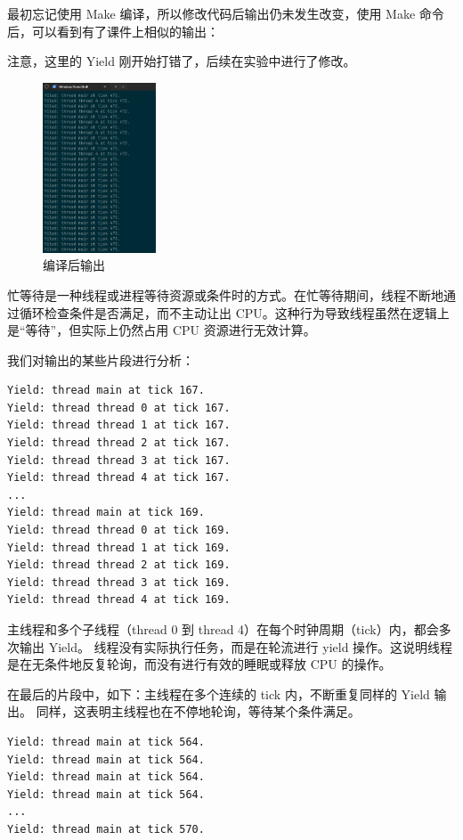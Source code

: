 最初忘记使用 Make 编译，所以修改代码后输出仍未发生改变，使用 Make 命令后，可以看到有了课件上相似的输出：

注意，这里的 Yield 刚开始打错了，后续在实验中进行了修改。
\begin{figure} [H]
    \centering
    \includegraphics[width=0.3\textwidth]{img4/make.png}
    \caption{编译后输出}
    \label{fig:pintos}
\end{figure}

忙等待是一种线程或进程等待资源或条件时的方式。在忙等待期间，线程不断地通过循环检查条件是否满足，而不主动让出 CPU。这种行为导致线程虽然在逻辑上是“等待”，但实际上仍然占用 CPU 资源进行无效计算。

我们对输出的某些片段进行分析：

\begin{lstlisting}
Yield: thread main at tick 167.
Yield: thread thread 0 at tick 167.
Yield: thread thread 1 at tick 167.
Yield: thread thread 2 at tick 167.
Yield: thread thread 3 at tick 167.
Yield: thread thread 4 at tick 167.
...
Yield: thread main at tick 169.
Yield: thread thread 0 at tick 169.
Yield: thread thread 1 at tick 169.
Yield: thread thread 2 at tick 169.
Yield: thread thread 3 at tick 169.
Yield: thread thread 4 at tick 169.
\end{lstlisting}

主线程和多个子线程（thread 0 到 thread 4）在每个时钟周期（tick）内，都会多次输出 Yield。
线程没有实际执行任务，而是在轮流进行 yield 操作。这说明线程是在无条件地反复轮询，而没有进行有效的睡眠或释放 CPU 的操作。

在最后的片段中，如下：主线程在多个连续的 tick 内，不断重复同样的 Yield 输出。
同样，这表明主线程也在不停地轮询，等待某个条件满足。

\begin{lstlisting}
Yield: thread main at tick 564.
Yield: thread main at tick 564.
Yield: thread main at tick 564.
Yield: thread main at tick 564.
...
Yield: thread main at tick 570.
\end{lstlisting}

